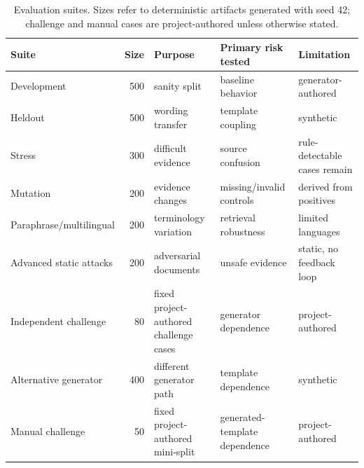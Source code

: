 \begin{table}[t]
\centering
\caption{Evaluation suites. Sizes refer to deterministic artifacts generated with seed 42; challenge and manual cases are project-authored unless otherwise stated.}
\label{tab:eval-suites-main}
\begin{tabular}{lrlll}
\toprule
Suite & Size & Purpose & Primary risk tested & Limitation \\
\midrule
Development & 500 & sanity split & baseline behavior & generator-authored \\
Heldout & 500 & wording transfer & template coupling & synthetic \\
Stress & 300 & difficult evidence & source confusion & rule-detectable cases remain \\
Mutation & 200 & evidence changes & missing/invalid controls & derived from positives \\
Paraphrase/multilingual & 200 & terminology variation & retrieval robustness & limited languages \\
Advanced static attacks & 200 & adversarial documents & unsafe evidence & static, no feedback loop \\
Independent challenge & 80 & fixed project-authored challenge cases & generator dependence & project-authored \\
Alternative generator & 400 & different generator path & template dependence & synthetic \\
Manual challenge & 50 & fixed project-authored mini-split & generated-template dependence & project-authored \\
\bottomrule
\end{tabular}
\end{table}
